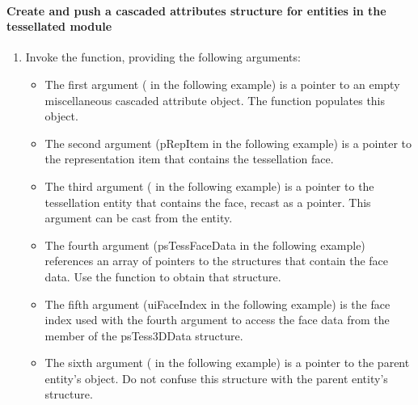 \documentclass[letterpaper,12pt,english,openany,oneside]{sphinxmanual}
\begin{document}
\paragraph{Create and push a cascaded attributes structure for entities in the tessellated module}
\label{\detokenize{Plugins_A3D_API:create-and-push-a-cascaded-attributes-structure-for-entities-in-the-tessellated-module}}\begin{enumerate}
%
\item {} 
Invoke the  function, providing the following arguments:
\begin{itemize}
\item {} 
The first argument ( in the following example) is a pointer to an empty miscellaneous cascaded attribute object. The  function populates this object.

\item {} 
The second argument (pRepItem in the following example) is a pointer to the representation item that contains the tessellation face.

\item {} 
The third argument ( in the following example) is a pointer to the tessellation entity that contains the face, recast as a  pointer. This argument can be cast from the  entity.

\item {} 
The fourth argument (psTessFaceData in the following example) references an array of pointers to the  structures that contain the face data. Use the  function to obtain that structure.

\item {} 
The fifth argument (uiFaceIndex in the following example) is the face index used with the fourth argument to access the face data from the  member of the psTess3DData structure.

\item {} 
The sixth argument ( in the following example) is a pointer to the parent entity’s  object. Do not confuse this structure with the parent entity’s  structure.

\end{itemize}

\end{enumerate}
\end{document}
